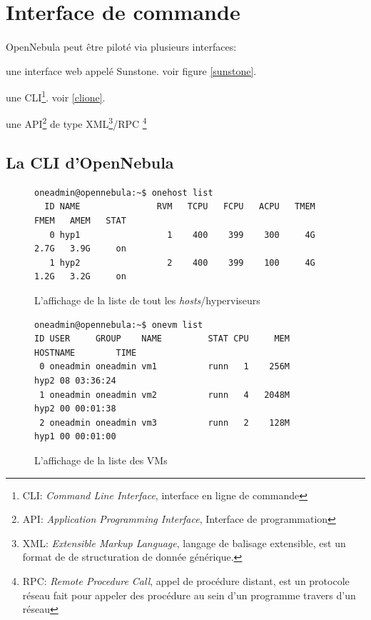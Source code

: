 \section{Interface de commande}
\paragraph*{}
OpenNebula peut être piloté via plusieurs interfaces:
\begin{listi}
	\item une interface web appelé Sunstone. voir figure \ref{sunstone}.
	\item une CLI\footnote{CLI: \emph{Command Line Interface}, interface en ligne de commande}. voir \ref{clione}.
	\item une API\footnote{API: \emph{Application Programming Interface}, Interface de programmation} de type
		XML\footnote{XML: \emph{Extensible Markup Language}, langage de balisage extensible, est un format de de structuration de donnée générique.}/RPC
		\footnote{RPC: \emph{Remote Procedure Call}, appel de procédure distant, est un protocole réseau fait pour appeler des procédure au sein d'un programme
		travers d'un réseau}
\end{listi}

\subsection{La CLI d'OpenNebula}
\label{onecli}

\begin{figure}[H]
\centering
\begin{lstlisting}
oneadmin@opennebula:~$ onehost list
  ID NAME               RVM   TCPU   FCPU   ACPU   TMEM   FMEM   AMEM   STAT
   0 hyp1                 1    400    399    300     4G   2.7G   3.9G     on
   1 hyp2                 2    400    399    100     4G   1.2G   3.2G     on
\end{lstlisting}
\caption{L'affichage de la liste de tout les \emph{hosts}/hyperviseurs}
\end{figure}


\begin{figure}[H]
\centering
\begin{lstlisting}
oneadmin@opennebula:~$ onevm list
ID USER     GROUP    NAME         STAT CPU     MEM        HOSTNAME        TIME
 0 oneadmin oneadmin vm1          runn   1    256M            hyp2 08 03:36:24
 1 oneadmin oneadmin vm2          runn   4   2048M            hyp2 00 00:01:38
 2 oneadmin oneadmin vm3          runn   2    128M            hyp1 00 00:01:00
\end{lstlisting}
\caption{L'affichage de la liste des VMs}
\end{figure}



